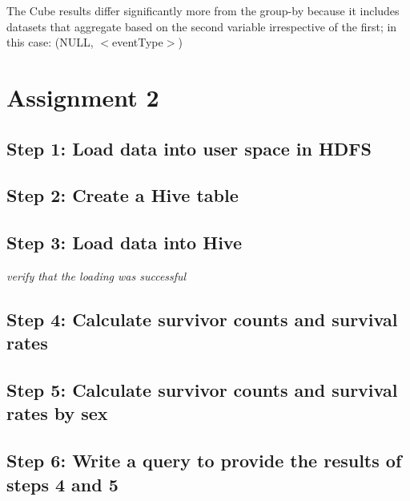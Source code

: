 \documentclass[]{article}
\begin{document}
The Cube results differ significantly more from the group-by because it includes datasets that aggregate based on the second variable irrespective of the first; in this case: (NULL, $<$eventType$>$)

\section*{Assignment 2}

\subsection*{Step 1: Load data into user space in HDFS} 
\subsection*{Step 2: Create a Hive table}
\subsection*{Step 3: Load data into Hive}
\emph{verify that the loading was successful}
\subsection*{Step 4: Calculate survivor counts and survival rates}
\subsection*{Step 5: Calculate survivor counts and survival rates by sex}
\subsection*{Step 6: Write a query to provide the results of steps 4 and 5}
\end{document}
